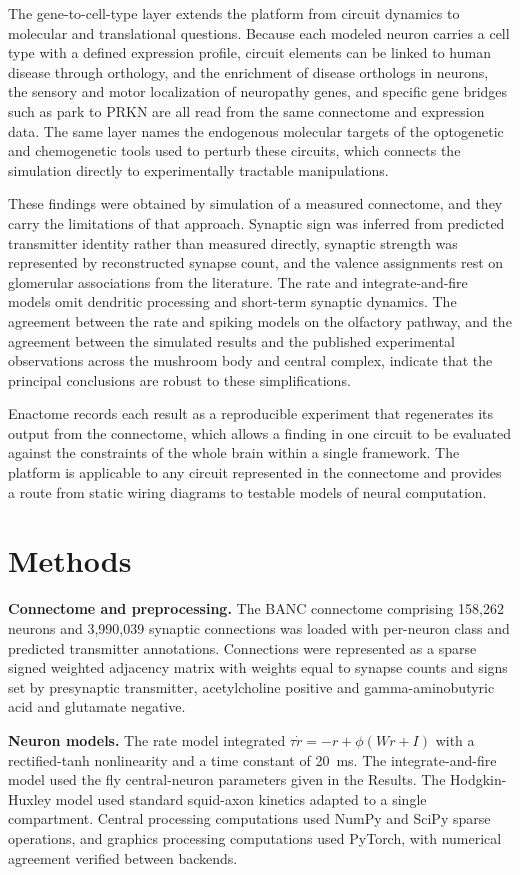 \documentclass[9pt,twocolumn,twoside]{article}
\begin{document}
The gene-to-cell-type layer extends the platform from circuit dynamics to molecular and translational
questions. Because each modeled neuron carries a cell type with a defined expression profile, circuit
elements can be linked to human disease through orthology, and the enrichment of disease orthologs in
neurons, the sensory and motor localization of neuropathy genes, and specific gene bridges such as
park to PRKN are all read from the same connectome and expression data. The same layer names the
endogenous molecular targets of the optogenetic and chemogenetic tools used to perturb these circuits,
which connects the simulation directly to experimentally tractable manipulations.

These findings were obtained by simulation of a measured connectome, and they carry the limitations
of that approach. Synaptic sign was inferred from predicted transmitter identity rather than measured
directly, synaptic strength was represented by reconstructed synapse count, and the valence
assignments rest on glomerular associations from the literature. The rate and integrate-and-fire
models omit dendritic processing and short-term synaptic dynamics. The agreement between the rate and
spiking models on the olfactory pathway, and the agreement between the simulated results and the
published experimental observations across the mushroom body and central complex, indicate that the
principal conclusions are robust to these simplifications.

Enactome records each result as a reproducible experiment that regenerates its output from the
connectome, which allows a finding in one circuit to be evaluated against the constraints of the whole
brain within a single framework. The platform is applicable to any circuit represented in the
connectome and provides a route from static wiring diagrams to testable models of neural computation.

\section{Methods}
\textbf{Connectome and preprocessing.} The BANC connectome comprising 158,262 neurons and 3,990,039
synaptic connections was loaded with per-neuron class and predicted transmitter annotations.
Connections were represented as a sparse signed weighted adjacency matrix with weights equal to
synapse counts and signs set by presynaptic transmitter, acetylcholine positive and
gamma-aminobutyric acid and glutamate negative.

\textbf{Neuron models.} The rate model integrated $\tau \dot{r} = -r + \phi(Wr + I)$ with a
rectified-tanh nonlinearity and a time constant of 20~ms. The integrate-and-fire model used the fly
central-neuron parameters given in the Results. The Hodgkin-Huxley model used standard squid-axon
kinetics adapted to a single compartment. Central processing computations used NumPy and SciPy sparse
operations, and graphics processing computations used PyTorch, with numerical agreement verified
between backends.
\end{document}
